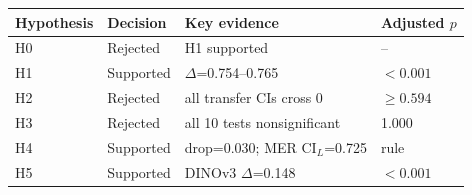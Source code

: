 \begin{tabular}{llll}
\toprule
Hypothesis & Decision & Key evidence & Adjusted $p$ \\
\midrule
H0 & Rejected & H1 supported & -- \\ 
H1 & Supported & $\Delta$=0.754--0.765 & $<0.001$ \\ 
H2 & Rejected & all transfer CIs cross 0 & $\geq0.594$ \\ 
H3 & Rejected & all 10 tests nonsignificant & 1.000 \\ 
H4 & Supported & drop=0.030; MER CI$_L$=0.725 & rule \\ 
H5 & Supported & DINOv3 $\Delta$=0.148 & $<0.001$ \\ 
\bottomrule
\end{tabular}
